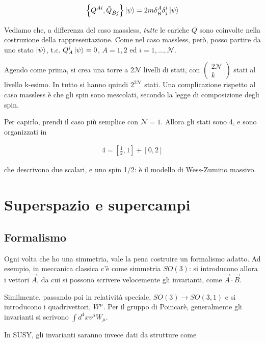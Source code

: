 \documentclass{report}
\begin{document}
\begin{align}
    \left\{Q^{Ai}, \bar{Q}_{\dot{B}j} \right\}\ket{\psi} = 2m \delta^A_{\dot{B}} \delta^i_j \ket{\psi}
\end{align}

Vediamo che, a differenza del caso massless, \emph{tutte} le cariche \(Q\) sono coinvolte nella costruzione della rappresentazione. Come nel caso massless, però, posso partire da uno stato \(\ket{\psi}\), t.c. \(Q_A^i \ket{\psi} = 0\), \(A=1, 2\) ed \(i=1, \ldots, \mathcal{N}\). 

Agendo come prima, si crea una torre a \(2\mathcal{N}\) livelli di stati, con \(\begin{pmatrix}
    2\mathcal{N} \\ k
\end{pmatrix}\) stati al livello k-esimo. In tutto si hanno quindi \(2^{2\mathcal{N}}\) stati. Una complicazione rispetto al caso massless è che gli spin sono mescolati, secondo la legge di composizione degli spin. 

Per capirlo, prendi il caso più semplice con \(\mathcal{N} = 1\). Allora gli stati sono 4, e sono organizzati in 

\begin{align}
    4 = \left[ \frac{1}{2}, 1 \right] + \left[ 0, 2 \right]
\end{align}

che descrivono due scalari, e uno spin 1/2: è il modello di Wess-Zumino massivo. 

\chapter{Superspazio e supercampi}

\section{Formalismo}

Ogni volta che ho una simmetria, vale la pena costruire un formalismo adatto. Ad esempio, in meccanica classica c'è come simmetria \(SO(3)\): si introducono allora i vettori \(\vec{A}\), da cui si possono scrivere velocemente gli invarianti, come \(\vec{A}\cdot \vec{B}\). 

Similmente, passando poi in relatività speciale, \(SO(3) \to SO(3, 1)\) e si introducono i quadrivettori, \(W^\mu\). Per il gruppo di Poincarè, generalmente gli invarianti si scrivono \(\int d^4x v^\mu W_\mu\). 

In SUSY, gli invarianti saranno invece dati da strutture come 
\end{document}
